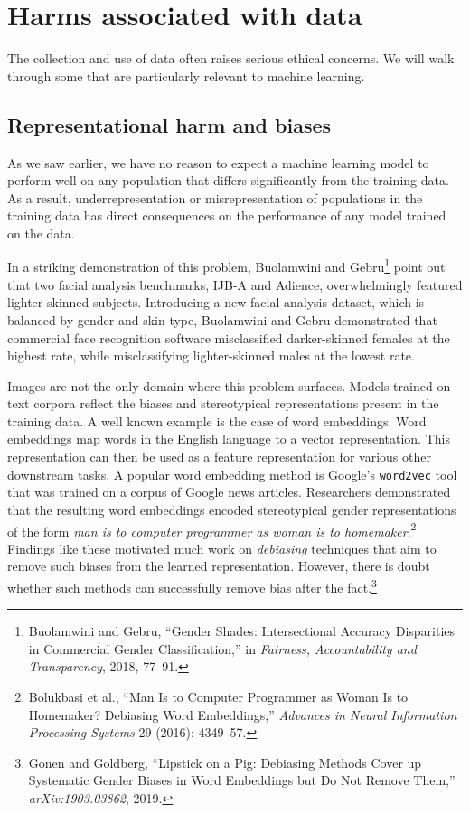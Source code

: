 \documentclass{tufte-book}
\begin{document}
\hypertarget{harms-associated-with-data}{%
\section{Harms associated with data}\label{harms-associated-with-data}}

The collection and use of data often raises serious ethical concerns. We
will walk through some that are particularly relevant to machine
learning.

\hypertarget{representational-harm-and-biases}{%
\subsection{Representational harm and
biases}\label{representational-harm-and-biases}}

As we saw earlier, we have no reason to expect a machine learning model
to perform well on any population that differs significantly from the
training data. As a result, underrepresentation or misrepresentation of
populations in the training data has direct consequences on the
performance of any model trained on the
data.

In a striking demonstration of this problem, Buolamwini and
Gebru\footnote{Buolamwini and Gebru, {``Gender Shades: Intersectional
  Accuracy Disparities in Commercial Gender Classification,''} in
  \emph{Fairness, Accountability and Transparency}, 2018, 77--91.} point
out that two facial analysis benchmarks, IJB-A and Adience,
overwhelmingly featured lighter-skinned subjects. Introducing a new
facial analysis dataset, which is balanced by gender and skin type,
Buolamwini and Gebru demonstrated that commercial face recognition
software misclassified darker-skinned females at the highest rate, while
misclassifying lighter-skinned males at the lowest rate.

Images are not the only domain where this problem surfaces. Models
trained on text corpora reflect the biases and stereotypical
representations present in the training data. A well known example is
the case of word embeddings. Word embeddings map words in the English
language to a vector representation. This representation can then be
used as a feature representation for various other downstream tasks. A
popular word embedding method is Google's \texttt{word2vec} tool that
was trained on a corpus of Google news articles. Researchers
demonstrated that the resulting word embeddings encoded stereotypical
gender representations of the form \emph{man is to computer programmer
as woman is to homemaker}.\footnote{Bolukbasi et al., {``Man Is to
  Computer Programmer as Woman Is to Homemaker? Debiasing Word
  Embeddings,''} \emph{Advances in Neural Information Processing
  Systems} 29 (2016): 4349--57.} Findings like these motivated much work
on \emph{debiasing} techniques that aim to remove such biases from the
learned representation. However, there is doubt whether such methods can
successfully remove bias after the
fact.\footnote{Gonen and Goldberg, {``Lipstick on a Pig: Debiasing
  Methods Cover up Systematic Gender Biases in Word Embeddings but Do
  Not Remove Them,''} \emph{arXiv:1903.03862}, 2019.}
\end{document}

